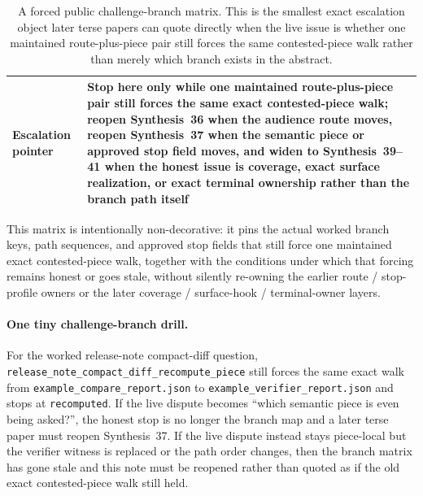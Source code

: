 \documentclass[11pt]{article}
\begin{document}
\begin{table}[t]
\begin{tabularx}{\linewidth}{@{}lX@{}}
Escalation pointer & Stop here only while one maintained route-plus-piece pair still forces the same exact contested-piece walk; reopen Synthesis~36 when the audience route moves, reopen Synthesis~37 when the semantic piece or approved stop field moves, and widen to Synthesis~39--41 when the honest issue is coverage, exact surface realization, or exact terminal ownership rather than the branch path itself \\
\bottomrule
\end{tabularx}
\caption{A forced public challenge-branch matrix. This is the smallest exact escalation object later terse papers can quote directly when the live issue is whether one maintained route-plus-piece pair still forces the same contested-piece walk rather than merely which branch exists in the abstract.}
\label{tab:forced-public-challenge-branch-matrix}
\end{table}

This matrix is intentionally non-decorative: it pins the actual worked branch keys, path sequences, and approved stop fields that still force one maintained exact contested-piece walk, together with the conditions under which that forcing remains honest or goes stale, without silently re-owning the earlier route / stop-profile owners or the later coverage / surface-hook / terminal-owner layers.\cite{series:workedexample}

\paragraph{One tiny challenge-branch drill.}
For the worked release-note compact-diff question, \nolinkurl{release_note_compact_diff_recompute_piece} still forces the same exact walk from \nolinkurl{example_compare_report.json} to \nolinkurl{example_verifier_report.json} and stops at \nolinkurl{recomputed}. If the live dispute becomes ``which semantic piece is even being asked?'', the honest stop is no longer the branch map and a later terse paper must reopen Synthesis~37. If the live dispute instead stays piece-local but the verifier witness is replaced or the path order changes, then the branch matrix has gone stale and this note must be reopened rather than quoted as if the old exact contested-piece walk still held.\cite{series:workedexample}
\end{document}
